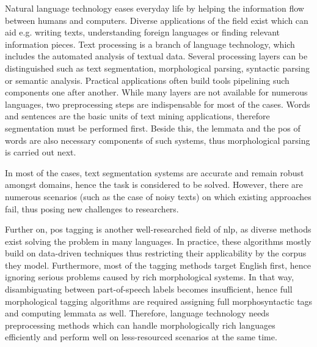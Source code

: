 
Natural language technology eases everyday life by helping the information flow between humans and computers.
Diverse applications of the field exist which can aid e.g. writing texts, understanding foreign languages or finding relevant information pieces.
Text processing is a branch of language technology, which includes the automated analysis of textual data. %
Several processing layers can be distinguished such as text segmentation, morphological parsing, syntactic parsing or semantic analysis.
Practical applications often build tools pipelining such components one after another. 
While many layers are not available for numerous languages, two preprocessing steps are indispensable for most of the cases.
Words and sentences are the basic units of text mining applications, therefore segmentation must be performed first.
Beside this, the lemmata and the \gls{pos} of words are also necessary components of such systems, thus morphological parsing is carried out next.

In most of the cases, text segmentation systems are accurate and remain robust amongst domains, hence the task is considered to be solved.
However, there are numerous scenarios (such as the case of noisy texts) on which existing approaches fail, thus posing new challenges to researchers.

Further on, \acrshort{pos} tagging is another well-researched field of \gls{nlp}, as diverse methods exist solving the problem in many languages. 
In practice, these algorithms mostly build on data-driven techniques thus restricting their applicability by the corpus they model.
Furthermore, most of the tagging methods target English first, hence ignoring serious problems caused by rich morphological systems.
In that way, disambiguating between part-of-speech labels becomes insufficient, hence full morphological tagging algorithms are required assigning full morphosyntactic tags and computing lemmata as well.
Therefore, language technology needs preprocessing methods which can handle morphologically rich languages efficiently 
and perform well on less-resourced scenarios at the same time.

